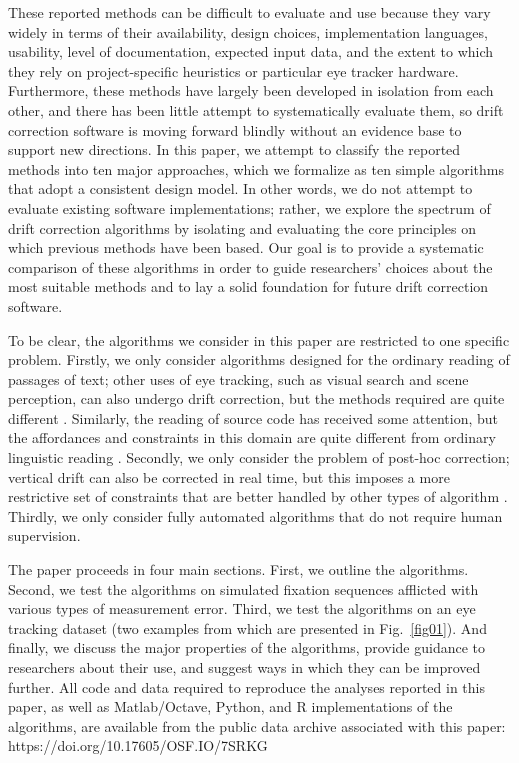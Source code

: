 \documentclass[doc,biblatex]{apa7}
\begin{document}
These reported methods can be difficult to evaluate and use because they vary widely in terms of their availability, design choices, implementation languages, usability, level of documentation, expected input data, and the extent to which they rely on project-specific heuristics or particular eye tracker hardware. Furthermore, these methods have largely been developed in isolation from each other, and there has been little attempt to systematically evaluate them, so drift correction software is moving forward blindly without an evidence base to support new directions. In this paper, we attempt to classify the reported methods into ten major approaches, which we formalize as ten simple algorithms that adopt a consistent design model. In other words, we do not attempt to evaluate existing software implementations; rather, we explore the spectrum of drift correction algorithms by isolating and evaluating the core principles on which previous methods have been based. Our goal is to provide a systematic comparison of these algorithms in order to guide researchers' choices about the most suitable methods and to lay a solid foundation for future drift correction software.

To be clear, the algorithms we consider in this paper are restricted to one specific problem. Firstly, we only consider algorithms designed for the ordinary reading of passages of text; other uses of eye tracking, such as visual search and scene perception, can also undergo drift correction, but the methods required are quite different \parencite[see e.g.,][]{Zhang:2011,Zhang:2014,Vadillo:2015}. Similarly, the reading of source code has received some attention, but the affordances and constraints in this domain are quite different from ordinary linguistic reading \parencite[see e.g.,][]{Palmer:2016,Nussli:2011}. Secondly, we only consider the problem of post-hoc correction; vertical drift can also be corrected in real time, but this imposes a more restrictive set of constraints that are better handled by other types of algorithm \parencite[see e.g.,][]{Hyrskykari:2006,Sibert:2000}. Thirdly, we only consider fully automated algorithms that do not require human supervision.

The paper proceeds in four main sections. First, we outline the algorithms. Second, we test the algorithms on simulated fixation sequences afflicted with various types of measurement error. Third, we test the algorithms on an eye tracking dataset (two examples from which are presented in Fig.~\ref{fig01}). And finally, we discuss the major properties of the algorithms, provide guidance to researchers about their use, and suggest ways in which they can be improved further. All code and data required to reproduce the analyses reported in this paper, as well as Matlab/Octave, Python, and R implementations of the algorithms, are available from the public data archive associated with this paper: https://doi.org/10.17605/OSF.IO/7SRKG
\end{document}

